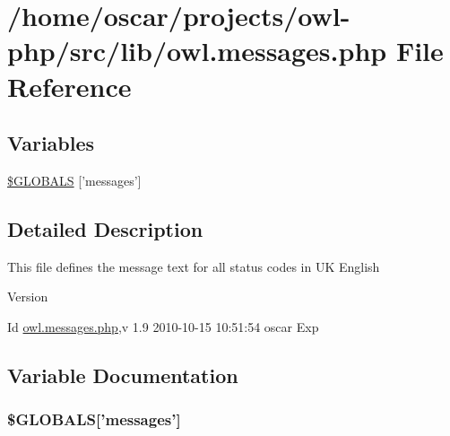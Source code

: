 \section{/home/oscar/projects/owl-\/php/src/lib/owl.messages.php File Reference}
\label{owl_8messages_8php}
\subsection*{Variables}
\begin{DoxyCompactItemize}
\item 
\hyperlink{owl_8messages_8php_a65f2996116eed36e9ab25f254a470259}{\$GLOBALS} \mbox{[}'messages'\mbox{]}
\end{DoxyCompactItemize}


\subsection{Detailed Description}
This file defines the message text for all status codes in UK English \begin{DoxyVersion}{Version}

\end{DoxyVersion}
\begin{DoxyParagraph}{Id}
\hyperlink{owl_8messages_8php}{owl.messages.php},v 1.9 2010-\/10-\/15 10:51:54 oscar Exp 
\end{DoxyParagraph}


\subsection{Variable Documentation}
\subsubsection[{\$GLOBALS}]{\setlength{\rightskip}{0pt plus 5cm}\$GLOBALS\mbox{[}'messages'\mbox{]}}\label{owl_8messages_8php_a65f2996116eed36e9ab25f254a470259}
